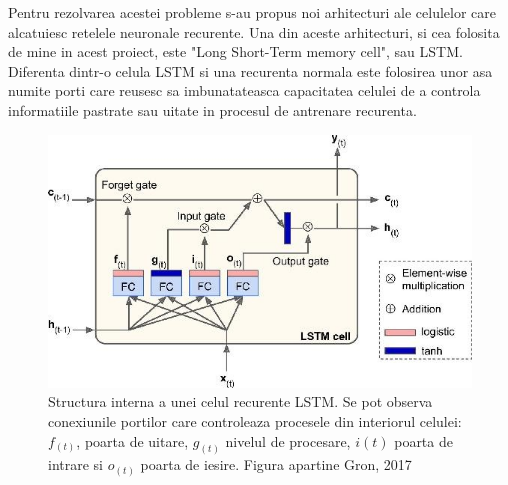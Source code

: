 \documentclass[a4paper,12pt]{book}
\begin{document}
				Pentru rezolvarea acestei probleme s-au propus noi arhitecturi ale celulelor care alcatuiesc retelele neuronale recurente. Una din aceste arhitecturi, si cea folosita de mine in acest proiect, este "Long Short-Term memory cell", sau LSTM. Diferenta dintr-o celula LSTM si una recurenta normala este folosirea unor asa numite porti care reusesc sa imbunatateasca capacitatea celulei de a controla informatiile pastrate sau uitate in procesul de antrenare recurenta.
				
				\begin{figure}[h]
					\centering
					\includegraphics[scale=0.5]{lstm}
					\caption{Structura interna a unei celul recurente LSTM. Se pot observa conexiunile portilor care controleaza procesele din interiorul celulei: $f_{(t)}$, poarta de uitare, $g_{(t)}$ nivelul de procesare, $i{(t)}$ poarta de intrare si $o_{(t)}$ poarta de iesire. Figura apartine Gron, 2017 \cite{hands}}
					\label{fig:lstm}
				\end{figure} 
			
\end{document}
